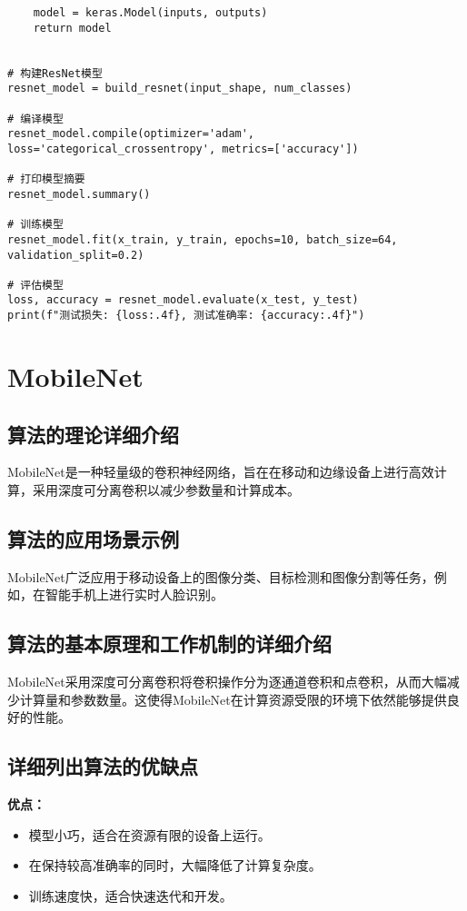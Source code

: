 \begin{lstlisting}
    model = keras.Model(inputs, outputs)
    return model


# 构建ResNet模型
resnet_model = build_resnet(input_shape, num_classes)

# 编译模型
resnet_model.compile(optimizer='adam', loss='categorical_crossentropy', metrics=['accuracy'])

# 打印模型摘要
resnet_model.summary()

# 训练模型
resnet_model.fit(x_train, y_train, epochs=10, batch_size=64, validation_split=0.2)

# 评估模型
loss, accuracy = resnet_model.evaluate(x_test, y_test)
print(f"测试损失: {loss:.4f}, 测试准确率: {accuracy:.4f}")

\end{lstlisting}


\section{MobileNet}
\subsection*{算法的理论详细介绍}
MobileNet是一种轻量级的卷积神经网络，旨在在移动和边缘设备上进行高效计算，采用深度可分离卷积以减少参数量和计算成本。

\subsection*{算法的应用场景示例}
MobileNet广泛应用于移动设备上的图像分类、目标检测和图像分割等任务，例如，在智能手机上进行实时人脸识别。

\subsection*{算法的基本原理和工作机制的详细介绍}
MobileNet采用深度可分离卷积将卷积操作分为逐通道卷积和点卷积，从而大幅减少计算量和参数数量。这使得MobileNet在计算资源受限的环境下依然能够提供良好的性能。

\subsection*{详细列出算法的优缺点}
\textbf{优点：}
\begin{itemize}
    \item 模型小巧，适合在资源有限的设备上运行。
    \item 在保持较高准确率的同时，大幅降低了计算复杂度。
    \item 训练速度快，适合快速迭代和开发。
\end{itemize}

